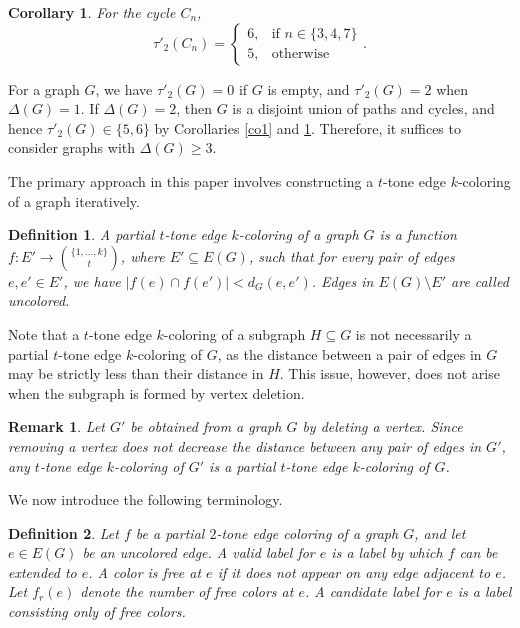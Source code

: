 \documentclass[12pt]{article}
\theoremstyle{plain}
\numberwithin{theorem}{section}
\numberwithin{conjecture}{section}
\newtheorem{corollary}{Corollary}
\numberwithin{corollary}{section}
\numberwithin{example}{section}
\numberwithin{lemma}{section}
\numberwithin{proposition}{section}
\numberwithin{problem}{section}
\newtheorem{remark}{Remark}
\numberwithin{remark}{section}
\numberwithin{claim}{theorem}
\newtheorem{definition}{Definition}
\numberwithin{definition}{section}
\begin{document}
\begin{corollary}\label{cc1}
For the cycle $C_n$, 
\[
\tau'_2(C_n)=
\begin{cases}
6, & \text{if } n \in \{3,4,7\}\\
5, & \text{otherwise}
\end{cases}.
\]
\end{corollary}

For a graph $G$, we have $\tau'_2(G)=0$ if $G$ is empty, and $\tau'_2(G)=2$ when $\Delta(G)=1$. If $\Delta(G)=2$, then $G$ is a disjoint union of paths and cycles, and hence $\tau'_2(G)\in\{5,6\}$ by Corollaries \ref{co1} and \ref{cc1}. Therefore, it suffices to consider graphs with $\Delta(G)\ge 3$.

The primary approach in this paper involves constructing a $t$-tone edge $k$-coloring of a graph iteratively. 

\begin{definition}
A \emph{partial $t$-tone edge $k$-coloring} of a graph $G$ is a function 
$f : E' \to \binom{\{1,\dots,k\}}{t}$, where $E' \subseteq E(G)$, such that for every pair of edges $e,e' \in E'$, we have $|f(e)\cap f(e')| < d_G(e,e')$. Edges in $E(G) \setminus E'$ are called \emph{uncolored}.
\end{definition}

Note that a $t$-tone edge $k$-coloring of a subgraph $H \subseteq G$ is not necessarily a partial $t$-tone edge $k$-coloring of $G$, as the distance between a pair of edges in $G$ may be strictly less than their distance in $H$. This issue, however, does not arise when the subgraph is formed by vertex deletion.

\begin{remark}\label{r1}
 Let $G'$ be obtained from a graph $G$ by deleting a vertex. Since removing a vertex does not decrease the distance between any pair of edges in $G'$, any $t$-tone edge $k$-coloring of $G'$ is a partial $t$-tone edge $k$-coloring of $G$.
\end{remark}

We now introduce the following terminology.

\begin{definition}
Let $f$ be a partial $2$-tone edge coloring of a graph $G$, and let $e \in E(G)$ be an uncolored edge. A \emph{valid label} for $e$ is a label by which $f$ can be extended to $e$. A color is \emph{free at $e$} if it does not appear on any edge adjacent to $e$. Let $f_r(e)$ denote the number of free colors at $e$. A \emph{candidate label} for $e$ is a label consisting only of free colors. 
\end{definition}
\end{document}
